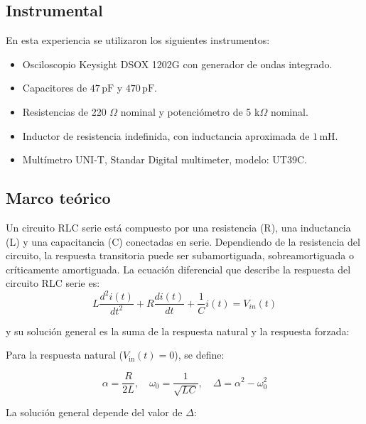 \documentclass{article}
\begin{document}
    \subsection{Instrumental}
        En esta experiencia se utilizaron los siguientes instrumentos:
\begin{itemize}
  \item Osciloscopio Keysight DSOX 1202G con generador de ondas integrado.
  \item Capacitores de $47\,\text{pF}$ y $470\,\text{pF}$.
  \item Resistencias de 220 $\Omega$ nominal y potenciómetro de 5 k$\Omega$ nominal.
  \item Inductor de resistencia indefinida, con inductancia aproximada de $1\,\text{mH}$.
  \item Multímetro UNI-T,  Standar Digital multimeter, modelo: UT39C.
\end{itemize}

    \subsection{Marco teórico}

        Un circuito RLC serie está compuesto por una resistencia (R),
         una 
        inductancia (L) y una capacitancia (C) conectadas en serie.
        Dependiendo de la resistencia del circuito, la respuesta transitoria
         puede ser subamortiguada, sobreamortiguada o críticamente 
         amortiguada. La ecuación diferencial que describe la 
         respuesta del circuito RLC serie es:
        \begin{equation}
            L\frac{d^2i(t)}{dt^2} + R\frac{di(t)}{dt} + \frac{1}{C}i(t) = V_{in}(t)
        \end{equation}

        y su solución general es la suma de la respuesta natural y la respuesta forzada:

Para la respuesta natural (\( V_{\text{in}}(t) = 0 \)), se define:

\begin{equation}
\alpha = \frac{R}{2L}, \quad \omega_0 = \frac{1}{\sqrt{LC}}, \quad \Delta = \alpha^2 - \omega_0^2
\end{equation}

La solución general depende del valor de \( \Delta \):
\end{document}
